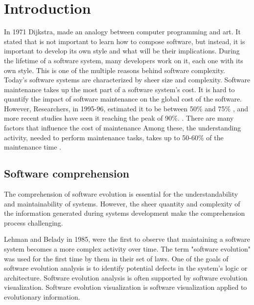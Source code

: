 \chapter{Introduction}

In 1971 Dijkstra, made an analogy between computer programming and art. It stated that is not important to learn how to compose software, but instead, it is important to develop its own style and what will be their implications. 
During the lifetime of a software system, many developers work on it, each one with its own style. This is one of the multiple reasons behind software complexity. 
Today's software systems are characterized by sheer size and complexity. Software maintenance takes up the most part of a software system's cost. 
It is hard to quantify the impact of software maintenance on the global cost of the software. 
However, Researchers, in 1995-96, estimated it to be between 50\% and 75\% \cite{Davis1995} \cite{Sommerville1995}, and more recent studies have seen it reaching the peak of 90\%.  \cite{Erlikh2000} \cite{seacord2003}. There are many factors that influence the cost of maintenance Among these, the understanding activity, needed to perform maintenance tasks, takes up to 50-60\% of the maintenance time \cite{Corbi1989}. 


\section{Software comprehension}
The comprehension of software evolution is essential for the understandability and maintainability of systems.
However, the sheer quantity and complexity of the information generated during systems development make the comprehension process challenging.

Lehman and Belady in 1985, were the first to observe that maintaining a software system becomes a more complex activity over time. \cite{Lehman1985}
The term "software evolution" was used for the first time by them in their set of laws. 
One of the goals of software evolution analysis is to identify potential defects in the system's logic or architecture. 
Software evolution analysis is often supported by software evolution visualization.
Software evolution visualization is software visualization applied to evolutionary information.

